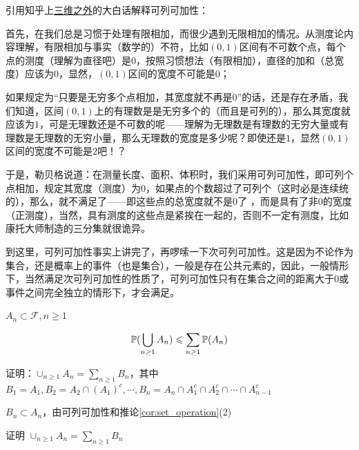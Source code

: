 \begin{remark}
    引用知乎上\href{https://www.zhihu.com/question/25836213/answer/1204497999}{三维之外}的大白话解释可列可加性：

    首先，在我们总是习惯于处理有限相加，而很少遇到无限相加的情况。从测度论内容理解，有限相加与事实（数学的）不符，比如$(0,1)$区间有不可数个点，每个点的测度（理解为直径吧）是$0$，按照习惯想法（有限相加），直径的加和（总宽度）应该为$0$，显然，$(0,1)$区间的宽度不可能是$0$；
    
    如果规定为“只要是无穷多个点相加，其宽度就不再是$0$”的话，还是存在矛盾，我们知道，区间$(0,1)$上的有理数是是无穷多个的（而且是可列的），那么其宽度就应该为$1$，可是无理数还是不可数的呢——理解为无理数是有理数的无穷大量或有理数是无理数的无穷小量，那么无理数的宽度是多少呢？即使还是$1$，显然$(0,1)$区间的宽度不可能是$2$吧！？
    
    于是，勒贝格说道：在测量长度、面积、体积时，我们采用可列可加性，即可列个点相加，规定其宽度（测度）为$0$，如果点的个数超过了可列个（这时必是连续统的），那么，就不满足了——即这些点的总宽度就不是$0$了 ，而是具有了非$0$的宽度（正测度），当然，具有测度的这些点是紧挨在一起的，否则不一定有测度，比如康托大师制造的三分集就很诡异。
    
    到这里，可列可加性事实上讲完了，再啰嗦一下次可列可加性。这是因为不论作为集合，还是概率上的事件（也是集合），一般是存在公共元素的，因此，一般情形下，当然满足次可列可加性的性质了，可列可加性只有在集合之间的距离大于$0$或事件之间完全独立的情形下，才会满足。
\end{remark}

\begin{property}[次可列可加性]
    $A_n\subset \mathcal{F}, n\geq 1$

    \[
    \mathbb{P}(\bigcup_{n\geq 1}A_n)\leqslant \sum_{n\geq 1}\mathbb{P}(A_n)
    \]
\end{property}

证明：$\cup_{n\geq 1}A_n=\sum_{n\geq 1}B_n$，其中 $B_1=A_1, B_2=A_2\cap (A_1)^c,\cdots , B_n=A_n\cap A_1^c\cap A_2^c\cap \cdots \cap A_{n-1}^c$

$B_n\subset A_n$，由可列可加性和推论\ref{cor:set_operation}(2)

\begin{problem}[作业1-2]\label{exer:subadditivity}
证明 $\cup_{n\geq 1}A_n=\sum_{n\geq 1}B_n$
\end{problem}

